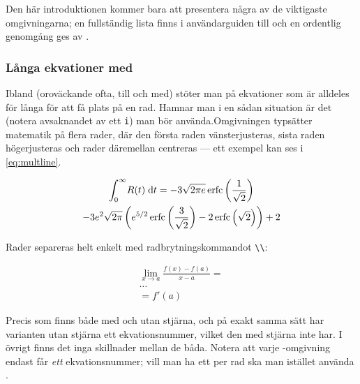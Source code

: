 \documentclass[../../a4.tex]{subfiles}
\begin{document}
Den här introduktionen kommer bara att presentera några av de viktigaste
omgivningarna; en fullständig lista finns i användarguiden till
 \cite{AMS99} och en ordentlig genomgång ges av
.

\subsubsection{Långa ekvationer med }
Ibland (oroväckande ofta, till och med) stöter man på ekvationer som är
alldeles för långa för att få plats på en rad. Hamnar man i en sådan
situation är det  (notera avsaknandet av ett \texttt{i})
man bör använda.\newpage  Omgivningen typsätter matematik på flera rader, där den
första raden vänsterjusteras, sista raden högerjusteras och rader 
däremellan centreras — ett exempel kan ses i \eqref{eq:multline}.

\begin{multline}\label{eq:multline}
	\int_0^\infty\!R(t)\d{t} = -3\sqrt{2\pi 
	e}\erfc\left(\frac{1}{\sqrt{2}}\right) \\
	-3e^2\sqrt{2\pi}\left(e^{5/2}\erfc\left(
	\frac{3}{\sqrt{2}}\right) - 2\erfc\left(
	\sqrt{2}\right)\right) + 2
\end{multline}

Rader separeras helt enkelt med radbrytningskommandot \verb|\\|:
\begin{latexcode}
\begin{multline}
\lim_{x\to a} \frac{f(x) - f(a)}{x - a} = \\
\ldots \\
= f'(a)
\end{multline}
\end{latexcode}

Precis som  finns  både med och utan stjärna,
och på exakt samma sätt har varianten utan stjärna ett ekvationsnummer,
vilket den med stjärna inte har. I övrigt finns det inga skillnader mellan
de båda. Notera att varje -omgivning endast får \emph{ett}
ekvationsnummer; vill man ha ett per rad ska man istället använda
.
\end{document}
